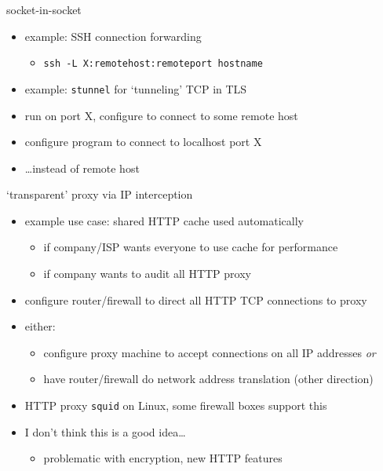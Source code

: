 
\begin{frame}{socket-in-socket}
    \begin{itemize}
    \item example: SSH connection forwarding
        \begin{itemize}
        \item \texttt{ssh -L X:remotehost:remoteport hostname}
        \end{itemize}
    \item example: \texttt{stunnel} for `tunneling' TCP in TLS
    \item run on port X, configure to connect to some remote host
    \item configure program to connect to localhost port X
    \item \ldots instead of remote host
    \end{itemize}
\end{frame}


\begin{frame}[fragile]{`transparent' proxy via IP interception}
    \begin{itemize}
    \item example use case: shared HTTP cache used automatically
        \begin{itemize}
        \item if company/ISP wants everyone to use cache for performance
        \item if company wants to audit all HTTP proxy
        \end{itemize}
    \item configure router/firewall to direct all HTTP TCP connections to proxy
    \item either:
        \begin{itemize}
        \item configure proxy machine to accept connections on all IP addresses \textit{or}
        \item have router/firewall do network address translation (other direction)
        \end{itemize}
    \item HTTP proxy \texttt{squid} on Linux, some firewall boxes support this
    \item I don't think this is a good idea\ldots
        \begin{itemize}
        \item problematic with encryption, new HTTP features
        \end{itemize}
    \end{itemize}
\end{frame}


